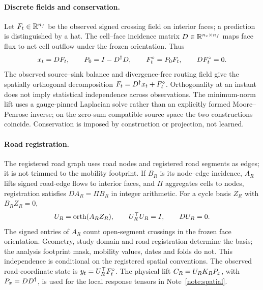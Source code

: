 
\paragraph{Discrete fields and conservation.} Let $F_t\in\mathbb{R}^{n_f}$ be the observed signed crossing field on interior faces; a prediction is distinguished by a hat. The cell--face incidence matrix $D\in\mathbb{R}^{n_c\times n_f}$ maps face flux to net cell outflow under the frozen orientation. Thus
\begin{equation}
 x_t=DF_t,\qquad P_0=I-D^\dagger D,\qquad
 F^{\circ}_t=P_0F_t,\qquad DF^{\circ}_t=0 .
 \label{eq:supp-field-decomposition}
\end{equation}
The observed source--sink balance and divergence-free routing field give the spatially orthogonal decomposition $F_t=D^\dagger x_t+F^{\circ}_t$. Orthogonality at an instant does not imply statistical independence across observations. The minimum-norm lift uses a gauge-pinned Laplacian solve rather than an explicitly formed Moore--Penrose inverse; on the zero-sum compatible source space the two constructions coincide. Conservation is imposed by construction or projection, not learned.

\paragraph{Road registration.} The registered road graph uses road nodes and registered road segments as edges; it is not trimmed to the mobility footprint. If $B_R$ is its node--edge incidence, $A_R$ lifts signed road-edge flows to interior faces, and $\Pi$ aggregates cells to nodes, registration satisfies $DA_R=\Pi B_R$ in integer arithmetic. For a cycle basis $Z_R$ with $B_RZ_R=0$,
\begin{equation}
 U_{R}=\operatorname{orth}(A_RZ_R),\qquad
 U_{R}^\top U_{R}=I,\qquad DU_{R}=0 .
 \label{eq:supp-road-basis}
\end{equation}
The signed entries of $A_R$ count open-segment crossings in the frozen face orientation. Geometry, study domain and road registration determine the basis; the analysis footprint mask, mobility values, dates and folds do not. This independence is conditional on the registered spatial conventions. The observed road-coordinate state is $y_t=U_{R}^\top F^{\circ}_t$. The physical lift $C_{R}=U_{R} K_RP_{x}$, with $P_{x}=DD^\dagger$, is used for the local response tensors in Note~\ref{note:spatial}.

